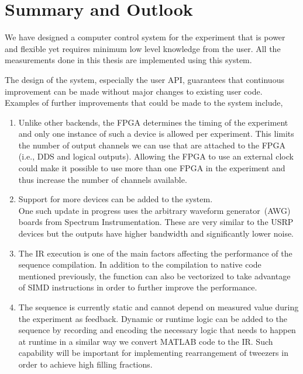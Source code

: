 \section{Summary and Outlook}
\label{ch:computer-control:summary}

We have designed a computer control system for the experiment
that is power and flexible yet requires minimum low level knowledge from the user.
All the measurements done in this thesis are implemented using this system.

The design of the system, especially the user API,
guarantees that continuous improvement can be made
without major changes to existing user code.
Examples of further improvements that could be made to the system include,
\begin{enumerate}
\item Unlike other backends, the FPGA determines the timing of the experiment
  and only one instance of such a device is allowed per experiment.
  This limits the number of output channels we can use that are attached to the FPGA
  (i.e., DDS and logical outputs).
  Allowing the FPGA to use an external clock could make it possible
  to use more than one FPGA in the experiment
  and thus increase the number of channels available.
\item Support for more devices can be added to the system.\\
  One such update in progress uses the arbitrary waveform generator~(AWG) boards
  from Spectrum Instrumentation.
  These are very similar to the USRP devices but the outputs have higher bandwidth
  and significantly lower noise.
\item The IR execution is one of the main factors affecting the performance
  of the sequence compilation.
  In addition to the compilation to native code mentioned previously,
  the function can also be vectorized to take advantage of SIMD instructions
  in order to further improve the performance.
\item The sequence is currently static and cannot depend on measured value
  during the experiment as feedback.
  Dynamic or runtime logic can be added to the sequence
  by recording and encoding the necessary logic that needs to happen at runtime
  in a similar way we convert MATLAB code to the IR.
  Such capability will be important for implementing rearrangement of tweezers
  in order to achieve high filling fractions.
\end{enumerate}

